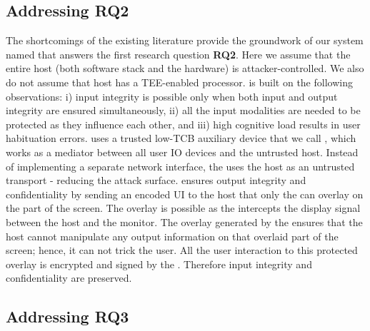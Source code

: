 \subsection{Addressing RQ2}
The shortcomings of the existing literature provide the groundwork of our system named \protection that answers the first research question \textbf{RQ2}. Here we assume that the entire host (both software stack and the hardware) is attacker-controlled. We also do not assume that host has a TEE-enabled processor. \protection is built on the following observations: i) input integrity is possible only when both input and output integrity are ensured simultaneously, ii) all the input modalities are needed to be protected as they influence each other, and iii) high cognitive load results in user habituation errors. \protection uses a trusted low-TCB auxiliary device that we call \deviceprotection, which works as a mediator between all user IO devices and the untrusted host. Instead of implementing a separate network interface, the \deviceprotection uses the host as an untrusted transport - reducing the attack surface. \protection ensures output integrity and confidentiality by sending an encoded UI to the host that only the \deviceprotection can overlay on the part of the screen. The overlay is possible as the \deviceprotection intercepts the display signal between the host and the monitor. The overlay generated by the \deviceprotection ensures that the host cannot manipulate any output information on that overlaid part of the screen; hence, it can not trick the user. All the user interaction to this protected overlay is encrypted and signed by the \deviceprotection. Therefore input integrity and confidentiality are preserved.

\subsection{Addressing RQ3}


